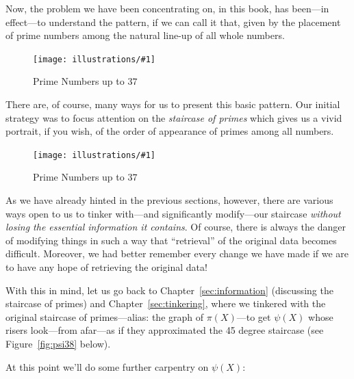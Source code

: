 \documentclass[openany]{book}
\newcommand{\ill}[3]{%
   \begin{figure}[H]%
   \vspace{-2ex}
   \centering%
   \texttt{[image: illustrations/\#1]}%
   \caption{#3}%
   \vspace{-2ex}
    \end{figure}}
\theoremstyle{plain}
\theoremstyle{definition}
\begin{document}
  
  
  
  Now, the problem we have been concentrating on, in this book, has
  been---in effect---to understand the pattern, if we can call it
  that, given by the placement of prime numbers among the natural
  line-up of all whole numbers.
 
 \ill{primes_line}{1}{Prime Numbers up to $37$}
  
 There are, of course, many ways for us to present this basic
 pattern. Our initial strategy was to focus attention on the {\it
   staircase of primes} which gives us a vivid portrait, if you wish,
 of the order of appearance of primes among all numbers.
 
 \ill{PN_38}{.45}{Prime Numbers up to $37$}
 
 As we have already hinted in the previous sections, however, there
 are various ways open to us to tinker with---and significantly
 modify---our staircase {\it without losing the essential information
   it contains}. Of course, there is always the danger of modifying
 things in such a way that ``retrieval'' of the original data becomes
 difficult.  Moreover, we had better remember every change we have
 made if we are to have any hope of retrieving the original data!
 
 With this in mind, let us go back to Chapter~\ref{sec:information}
 (discussing the staircase of primes) and Chapter~\ref{sec:tinkering},
 where we tinkered with the original staircase of primes---alias: the
 graph of $\pi(X)$---to get $\psi(X)$ whose risers look---from
 afar---as if they approximated the 45 degree staircase (see Figure~\ref{fig:psi38} below).
 
 
   At this point we'll do some further carpentry on $\psi(X)$:
   
\end{document}
